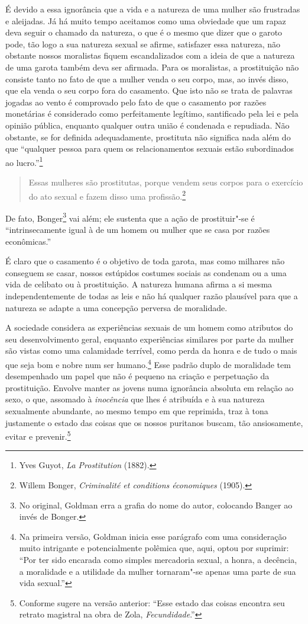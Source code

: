 É devido a essa ignorância que a vida e a natureza de uma mulher são
frustradas e aleijadas. Já há muito tempo aceitamos como uma obviedade
que um rapaz deva seguir o chamado da natureza, o que é o mesmo que
dizer que o garoto pode, tão logo a sua natureza sexual se afirme,
satisfazer essa natureza, não obstante nossos moralistas fiquem
escandalizados com a ideia de que a natureza de uma garota também deva
ser afirmada. Para os moralistas, a prostituição não consiste tanto no\label{vender}
fato de que a mulher venda o seu corpo, mas, ao invés disso, que ela
venda o seu corpo fora do casamento. Que isto não se trata de
palavras jogadas ao vento é comprovado pelo fato de que o casamento por razões
monetárias é considerado como perfeitamente legítimo, santificado pela
lei e pela opinião pública, enquanto qualquer outra união é condenada e
repudiada. Não obstante, se for definida adequadamente, prostituta
não significa nada além do que ``qualquer pessoa para quem os
relacionamentos sexuais estão subordinados ao lucro.''\footnote{Yves
  Guyot, \textit{La Prostitution} (1882).}

\begin{quote}
Essas mulheres são prostitutas, porque vendem seus corpos para o
exercício do ato sexual e fazem disso uma profissão.\footnote{Willem
  Bonger, \textit{Criminalité et conditions économiques} (1905).}
  \end{quote}

De fato, Bonger\footnote{No original, Goldman erra a grafia do nome do
  autor, colocando Banger ao invés de Bonger.} vai além; ele sustenta
que a ação de prostituir"-se é ``intrinsecamente igual à de um homem ou
mulher que se casa por razões econômicas.''

É claro que o casamento é o objetivo de toda garota, mas como milhares
não conseguem se casar, nossos estúpidos costumes sociais as condenam ou a
uma vida de celibato ou à prostituição. A natureza humana afirma a si
mesma independentemente de todas as leis e não há qualquer razão
plausível para que a natureza se adapte a uma concepção perversa de
moralidade.

A sociedade considera as experiências sexuais de um homem como atributos
do seu desenvolvimento geral, enquanto experiências similares por parte
da mulher são vistas como uma calamidade terrível, como perda da honra e
de tudo o mais que seja bom e nobre num ser humano.\footnote{Na primeira
  versão, Goldman inicia esse parágrafo com uma consideração muito
  intrigante e potencialmente polêmica que, aqui, optou por suprimir:
  ``Por ter sido encarada como simples mercadoria sexual, a honra, a
  decência, a moralidade e a utilidade da mulher tornaram"-se apenas uma
  parte de sua vida sexual.''} Esse padrão duplo de moralidade tem
desempenhado um papel que não é pequeno na criação e perpetuação da
prostituição. Envolve manter as jovens numa ignorância absoluta em relação ao sexo, o que, assomado à  \textit{inocência} que lhes é atribuída e à sua natureza sexualmente abundante, ao mesmo tempo em que reprimida, traz à tona justamente o estado das coisas que os nossos puritanos buscam, tão ansiosamente, evitar e prevenir.\footnote{Conforme sugere na versão anterior:
  ``Esse estado das coisas encontra seu retrato magistral na obra de
  Zola, \textit{Fecundidade}.''}

